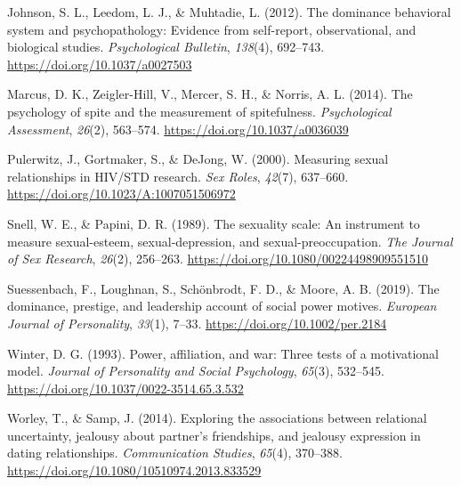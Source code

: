 \documentclass[
  english,
  a4paper]{apa7}
\newlength{\cslhangindent}
\newlength{\cslentryspacingunit} %
\newenvironment{CSLReferences}[2] %
 {%
  \setlength{\parindent}{0pt}
  \ifodd #1
  \let\oldpar\par
  \def\par{\hangindent=\cslhangindent\oldpar}
  \fi
  \setlength{\parskip}{#2\cslentryspacingunit}
 }%
 {}
\begin{document}
\hypertarget{refs}{}
\begin{CSLReferences}{1}{0}
\leavevmode{}%
Johnson, S. L., Leedom, L. J., \& Muhtadie, L. (2012). The dominance behavioral system and psychopathology: Evidence from self-report, observational, and biological studies. \emph{Psychological Bulletin}, \emph{138}(4), 692--743. \url{https://doi.org/10.1037/a0027503}

\leavevmode{}%
Marcus, D. K., Zeigler-Hill, V., Mercer, S. H., \& Norris, A. L. (2014). The psychology of spite and the measurement of spitefulness. \emph{Psychological Assessment}, \emph{26}(2), 563--574. \url{https://doi.org/10.1037/a0036039}

\leavevmode{}%
Pulerwitz, J., Gortmaker, S., \& DeJong, W. (2000). Measuring sexual relationships in {HIV}/{STD} research. \emph{Sex Roles}, \emph{42}(7), 637--660. \url{https://doi.org/10.1023/A:1007051506972}

\leavevmode{}%
Snell, W. E., \& Papini, D. R. (1989). The sexuality scale: An instrument to measure sexual-esteem, sexual-depression, and sexual-preoccupation. \emph{The Journal of Sex Research}, \emph{26}(2), 256--263. \url{https://doi.org/10.1080/00224498909551510}

\leavevmode{}%
Suessenbach, F., Loughnan, S., Schönbrodt, F. D., \& Moore, A. B. (2019). The dominance, prestige, and leadership account of social power motives. \emph{European Journal of Personality}, \emph{33}(1), 7--33. \url{https://doi.org/10.1002/per.2184}

\leavevmode{}%
Winter, D. G. (1993). Power, affiliation, and war: Three tests of a motivational model. \emph{Journal of Personality and Social Psychology}, \emph{65}(3), 532--545. \url{https://doi.org/10.1037/0022-3514.65.3.532}

\leavevmode{}%
Worley, T., \& Samp, J. (2014). Exploring the associations between relational uncertainty, jealousy about partner's friendships, and jealousy expression in dating relationships. \emph{Communication Studies}, \emph{65}(4), 370--388. \url{https://doi.org/10.1080/10510974.2013.833529}

\end{CSLReferences}

\endgroup
\end{document}
